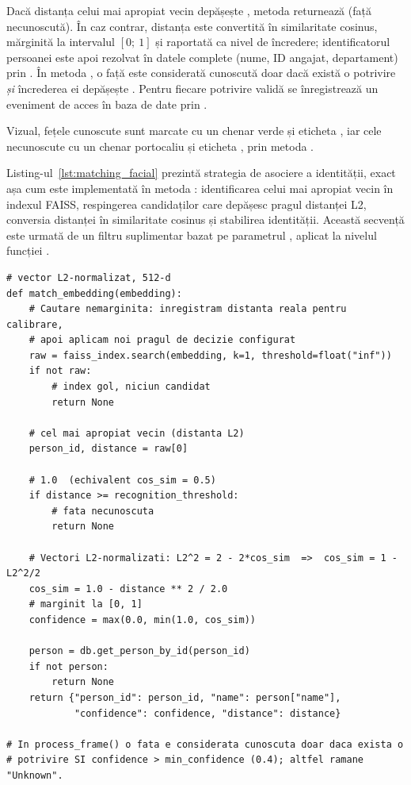 \documentclass[../../main.tex]{subfiles}
\begin{document}
Dacă distanța celui mai apropiat vecin depășește ,
metoda returnează  (față necunoscută). În caz contrar, distanța este
convertită în similaritate cosinus, mărginită la intervalul $[0;\ 1]$ și raportată ca
nivel de încredere; identificatorul persoanei este apoi rezolvat în datele complete
(nume, ID angajat, departament) prin . În metoda
 , o față este considerată cunoscută doar dacă există o
potrivire \textit{și} încrederea ei depășește . Pentru
fiecare potrivire validă se înregistrează un eveniment de acces în baza de date prin
.

Vizual, fețele cunoscute sunt marcate cu un chenar verde și eticheta
 , iar cele necunoscute cu un chenar portocaliu și eticheta
, prin metoda .

Listing-ul~\ref{lst:matching_facial} prezintă strategia de asociere a identității, exact așa cum este implementată în metoda : identificarea celui mai apropiat vecin în indexul FAISS, respingerea candidaților care depășesc pragul distanței L2, conversia distanței în similaritate cosinus și stabilirea identității. Această secvență este urmată de un filtru suplimentar bazat pe parametrul  \linebreak {}, aplicat la nivelul funcției .

\begin{listing}[H]
\begin{verbatim}
# vector L2-normalizat, 512-d
def match_embedding(embedding):
    # Cautare nemarginita: inregistram distanta reala pentru calibrare,
    # apoi aplicam noi pragul de decizie configurat
    raw = faiss_index.search(embedding, k=1, threshold=float("inf"))
    if not raw:
        # index gol, niciun candidat
        return None

    # cel mai apropiat vecin (distanta L2)
    person_id, distance = raw[0]

    # 1.0  (echivalent cos_sim = 0.5)
    if distance >= recognition_threshold:
        # fata necunoscuta
        return None

    # Vectori L2-normalizati: L2^2 = 2 - 2*cos_sim  =>  cos_sim = 1 - L2^2/2
    cos_sim = 1.0 - distance ** 2 / 2.0
    # marginit la [0, 1]
    confidence = max(0.0, min(1.0, cos_sim))

    person = db.get_person_by_id(person_id)
    if not person:
        return None
    return {"person_id": person_id, "name": person["name"],
            "confidence": confidence, "distance": distance}

# In process_frame() o fata e considerata cunoscuta doar daca exista o
# potrivire SI confidence > min_confidence (0.4); altfel ramane "Unknown".
\end{verbatim}
\caption{Strategia de matching facial (\texttt{\_match\_embedding} din \texttt{facial\_recognition\_system.py}).}
\label{lst:matching_facial}
\end{listing}
\end{document}
